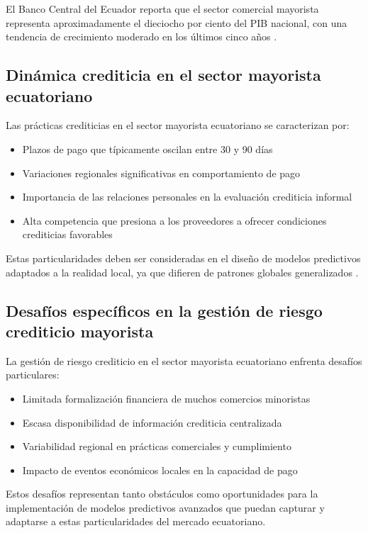 El Banco Central del Ecuador reporta que el sector comercial mayorista representa aproximadamente el dieciocho por ciento del PIB nacional, con una tendencia de crecimiento moderado en los últimos cinco años \citep{bce2023estadisticas}.

\subsection{Dinámica crediticia en el sector mayorista ecuatoriano}
Las prácticas crediticias en el sector mayorista ecuatoriano se caracterizan por:

\begin{itemize}
    \item Plazos de pago que típicamente oscilan entre 30 y 90 días
    \item Variaciones regionales significativas en comportamiento de pago
    \item Importancia de las relaciones personales en la evaluación crediticia informal
    \item Alta competencia que presiona a los proveedores a ofrecer condiciones crediticias favorables
\end{itemize}

Estas particularidades deben ser consideradas en el diseño de modelos predictivos adaptados a la realidad local, ya que difieren de patrones globales generalizados \citep{supercias2024analisis}.

\subsection{Desafíos específicos en la gestión de riesgo crediticio mayorista}
La gestión de riesgo crediticio en el sector mayorista ecuatoriano enfrenta desafíos particulares:

\begin{itemize}
    \item Limitada formalización financiera de muchos comercios minoristas
    \item Escasa disponibilidad de información crediticia centralizada
    \item Variabilidad regional en prácticas comerciales y cumplimiento
    \item Impacto de eventos económicos locales en la capacidad de pago
\end{itemize}

Estos desafíos representan tanto obstáculos como oportunidades para la implementación de modelos predictivos avanzados que puedan capturar y adaptarse a estas particularidades del mercado ecuatoriano.

